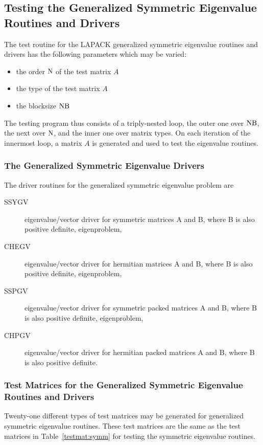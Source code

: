 \subsection{Testing the Generalized Symmetric Eigenvalue Routines and
Drivers}
\dent
The test routine for the LAPACK generalized symmetric eigenvalue
routines and drivers has the following parameters which may be varied:
\begin{itemize}
\item   the order ${\rm N}$ of the test matrix $A$
\item   the type of the test matrix $A$
\item   the blocksize ${\rm NB}$
\end{itemize}
The testing program thus consists of a triply-nested
loop, the outer one over ${\rm NB}$, the next
over ${\rm N}$, and the inner one over matrix types.
On each iteration of the innermost loop,
a matrix $A$ is generated and used
to test the eigenvalue routines.

\subsubsection{The Generalized Symmetric Eigenvalue Drivers}

The driver routines for the generalized symmetric eigenvalue problem are
\begin{description}
\item[SSYGV] eigenvalue/vector driver for symmetric matrices A and B,
where B is also positive definite,
eigenproblem, 
\item[CHEGV] eigenvalue/vector driver for hermitian matrices A and B,
where B is also positive definite,
eigenproblem,
\item[SSPGV] eigenvalue/vector driver for symmetric packed matrices A
and B, where B is also positive definite,
eigenproblem,
\item[CHPGV] eigenvalue/vector driver for hermitian packed matrices A
and B, where B is also positive definite.
\end{description}

\subsubsection{Test Matrices for the Generalized Symmetric Eigenvalue Routines
and Drivers}

Twenty-one different types of test matrices may be generated for
generalized symmetric eigenvalue routines.  These test matrices
are the same as the test matrices in Table~\ref{testmat:symm} for testing the
symmetric eigenvalue routines.

